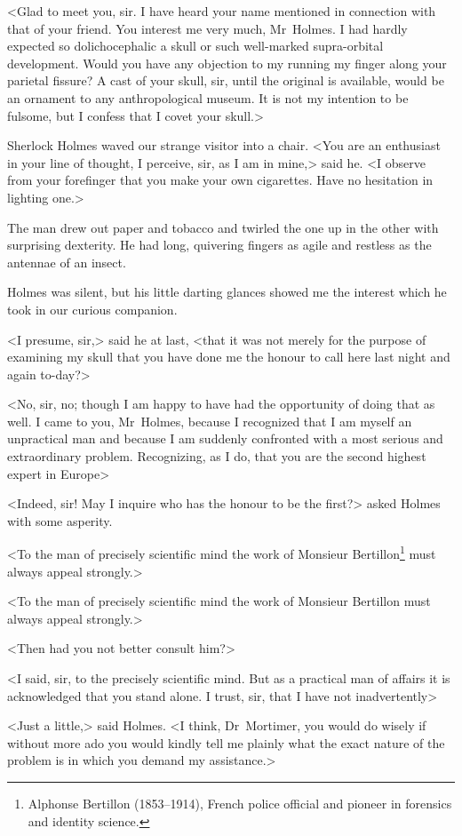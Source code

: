 \begin{withoutfootnotes}
<Glad to meet you, sir. I have heard your name mentioned in connection with that of your friend. You interest me very much, Mr~Holmes. I had hardly expected so dolichocephalic a skull or such well-marked supra-orbital development. Would you have any objection to my running my finger along your parietal fissure? A cast of your skull, sir, until the original is available, would be an ornament to any anthropological museum. It is not my intention to be fulsome, but I confess that I covet your skull.>
\end{withoutfootnotes}


Sherlock Holmes waved our strange visitor into a chair. <You are an enthusiast in your line of thought, I perceive, sir, as I am in mine,> said he. <I observe from your forefinger that you make your own cigarettes. Have no hesitation in lighting one.>

The man drew out paper and tobacco and twirled the one up in the other with surprising dexterity. He had long, quivering fingers as agile and restless as the antennae of an insect.

Holmes was silent, but his little darting glances showed me the interest which he took in our curious companion.

<I presume, sir,> said he at last, <that it was not merely for the purpose of examining my skull that you have done me the honour to call here last night and again to-day?>

<No, sir, no; though I am happy to have had the opportunity of doing that as well. I came to you, Mr~Holmes, because I recognized that I am myself an unpractical man and because I am suddenly confronted with a most serious and extraordinary problem. Recognizing, as I do, that you are the second highest expert in Europe\longdash>

<Indeed, sir! May I inquire who has the honour to be the first?> asked Holmes with some asperity.

\begin{withfootnotes}
<To the man of precisely scientific mind the work of Monsieur Bertillon\footnote{Alphonse Bertillon (1853--1914), French police official and pioneer in forensics and identity science.} must always appeal strongly.>
\end{withfootnotes}

\begin{withoutfootnotes}
<To the man of precisely scientific mind the work of Monsieur Bertillon must always appeal strongly.>
\end{withoutfootnotes}


<Then had you not better consult him?>

<I said, sir, to the precisely scientific mind. But as a practical man of affairs it is acknowledged that you stand alone. I trust, sir, that I have not inadvertently\longdash>

<Just a little,> said Holmes. <I think, Dr~Mortimer, you would do wisely if without more ado you would kindly tell me plainly what the exact nature of the problem is in which you demand my assistance.>
